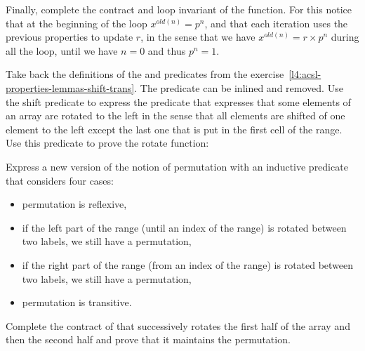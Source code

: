 Finally, complete the contract and loop invariant of the 
function. For this notice that at the beginning of the loop $x^{old(n)} = p^n$,
and that each iteration uses the previous properties to update $r$, in the sense
that we have $x^{old(n)} = r \times p^n$ during all the loop, until we have $n = 0$ and
thus $p^n = 1$.




Take back the definitions of the  and 
predicates from the exercise~\ref{l4:acsl-properties-lemmas-shift-trans}. The
 predicate can be inlined and removed. Use the
shift predicate to express the  predicate that expresses that
some elements of an array are rotated to the left in the sense that all elements
are shifted of one element to the left except the last one that is put in the
first cell of the range. Use this predicate to prove the rotate function:




Express a new version of the notion of permutation with an inductive predicate
that considers four cases:
\begin{itemize}
\item permutation is reflexive,
\item if the left part of the range (until an index of the range) is rotated
  between two labels, we still have a permutation,
\item if the right part of the range (from an index of the range) is rotated
  between two labels, we still have a permutation,
\item permutation is transitive.
\end{itemize}




Complete the contract of  that successively rotates the
first half of the array and then the second half and prove that it maintains the
permutation.



